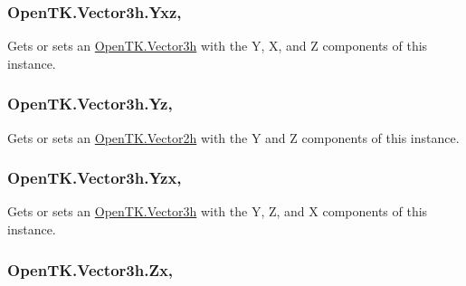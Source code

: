 \hypertarget{struct_open_t_k_1_1_vector3h_a1153d34161e8b1b76e1daedef27b8691}{
\subsubsection[{Yxz}]{ Open\-T\-K.\-Vector3h.\-Yxz\hspace{0.3cm}{\ttfamily [get]}, {\ttfamily [set]}}}\label{struct_open_t_k_1_1_vector3h_a1153d34161e8b1b76e1daedef27b8691}


Gets or sets an \hyperlink{struct_open_t_k_1_1_vector3h}{Open\-T\-K.\-Vector3h} with the Y, X, and Z components of this instance. 

\hypertarget{struct_open_t_k_1_1_vector3h_a9172e82a50106f8eb80f62b901418151}{
\subsubsection[{Yz}]{ Open\-T\-K.\-Vector3h.\-Yz\hspace{0.3cm}{\ttfamily [get]}, {\ttfamily [set]}}}\label{struct_open_t_k_1_1_vector3h_a9172e82a50106f8eb80f62b901418151}


Gets or sets an \hyperlink{struct_open_t_k_1_1_vector2h}{Open\-T\-K.\-Vector2h} with the Y and Z components of this instance. 

\hypertarget{struct_open_t_k_1_1_vector3h_a31eaef98f6b957b90756a3b51df9e14d}{
\subsubsection[{Yzx}]{ Open\-T\-K.\-Vector3h.\-Yzx\hspace{0.3cm}{\ttfamily [get]}, {\ttfamily [set]}}}\label{struct_open_t_k_1_1_vector3h_a31eaef98f6b957b90756a3b51df9e14d}


Gets or sets an \hyperlink{struct_open_t_k_1_1_vector3h}{Open\-T\-K.\-Vector3h} with the Y, Z, and X components of this instance. 

\hypertarget{struct_open_t_k_1_1_vector3h_ab8db906757da2dc6f07320fce354188d}{
\subsubsection[{Zx}]{ Open\-T\-K.\-Vector3h.\-Zx\hspace{0.3cm}{\ttfamily [get]}, {\ttfamily [set]}}}\label{struct_open_t_k_1_1_vector3h_ab8db906757da2dc6f07320fce354188d}


